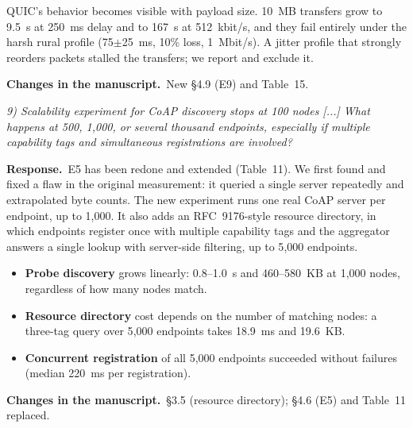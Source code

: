 \documentclass[11pt,a4paper]{article}
\newenvironment{comment}{\par\medskip\noindent\begin{minipage}{\linewidth}\color{blue!45!black}\itshape}{\end{minipage}\par}
\newcommand{\reply}{\par\smallskip\noindent\textbf{Response.}~}
\newcommand{\changes}{\par\smallskip\noindent\textbf{Changes in the manuscript.}~}
\begin{document}
QUIC's behavior becomes visible with payload size. 10~MB transfers grow to 9.5~s at 250~ms delay and to 167~s at 512~kbit/s, and they fail entirely under the harsh rural profile (75$\pm$25~ms, 10\% loss, 1~Mbit/s). A jitter profile that strongly reorders packets stalled the transfers; we report and exclude it.

\changes New \S4.9 (E9) and Table~15.

\begin{comment}
9) Scalability experiment for CoAP discovery stops at 100 nodes [...] What happens at 500, 1,000, or several thousand endpoints, especially if multiple capability tags and simultaneous registrations are involved?
\end{comment}
\reply E5 has been redone and extended (Table~11). We first found and fixed a flaw in the original measurement: it queried a single server repeatedly and extrapolated byte counts. The new experiment runs one real CoAP server per endpoint, up to 1{,}000. It also adds an RFC~9176-style resource directory, in which endpoints register once with multiple capability tags and the aggregator answers a single lookup with server-side filtering, up to 5{,}000 endpoints.
\begin{itemize}[leftmargin=1.3em,itemsep=0.1em]
\item \textbf{Probe discovery} grows linearly: 0.8--1.0~s and 460--580~KB at 1{,}000 nodes, regardless of how many nodes match.
\item \textbf{Resource directory} cost depends on the number of matching nodes: a three-tag query over 5{,}000 endpoints takes 18.9~ms and 19.6~KB.
\item \textbf{Concurrent registration} of all 5{,}000 endpoints succeeded without failures (median 220~ms per registration).
\end{itemize}

\changes \S3.5 (resource directory); \S4.6 (E5) and Table~11 replaced.
\end{document}
